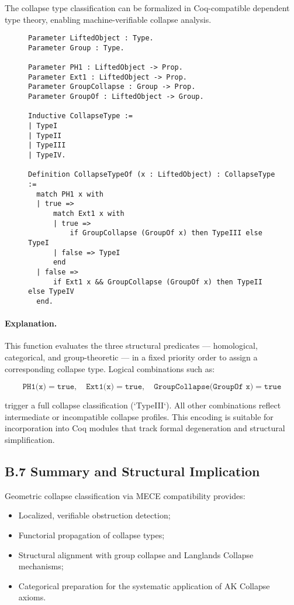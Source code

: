 \documentclass[11pt]{article}
\begin{document}
The collapse type classification can be formalized in Coq-compatible dependent type theory, enabling machine-verifiable collapse analysis.

\begin{figure}[h]
\centering
\begin{lstlisting}[language=Coq, caption=Collapse Type Assignment in Coq]
Parameter LiftedObject : Type.
Parameter Group : Type.

Parameter PH1 : LiftedObject -> Prop.
Parameter Ext1 : LiftedObject -> Prop.
Parameter GroupCollapse : Group -> Prop.
Parameter GroupOf : LiftedObject -> Group.

Inductive CollapseType :=
| TypeI
| TypeII
| TypeIII
| TypeIV.

Definition CollapseTypeOf (x : LiftedObject) : CollapseType :=
  match PH1 x with
  | true =>
      match Ext1 x with
      | true =>
          if GroupCollapse (GroupOf x) then TypeIII else TypeI
      | false => TypeI
      end
  | false =>
      if Ext1 x && GroupCollapse (GroupOf x) then TypeII else TypeIV
  end.
\end{lstlisting}
\end{figure}

\paragraph{Explanation.}
This function evaluates the three structural predicates — homological, categorical, and group-theoretic — in a fixed priority order to assign a corresponding collapse type. Logical combinations such as:

\[
\texttt{PH1(x)} = \texttt{true},\quad \texttt{Ext1(x)} = \texttt{true},\quad \texttt{GroupCollapse(GroupOf x)} = \texttt{true}
\]

trigger a full collapse classification (`TypeIII`). All other combinations reflect intermediate or incompatible collapse profiles. This encoding is suitable for incorporation into Coq modules that track formal degeneration and structural simplification.


\subsection*{B.7 Summary and Structural Implication}

Geometric collapse classification via MECE compatibility provides:

\begin{itemize}
    \item Localized, verifiable obstruction detection;
    \item Functorial propagation of collapse types;
    \item Structural alignment with group collapse and Langlands Collapse mechanisms;
    \item Categorical preparation for the systematic application of AK Collapse axioms.
\end{itemize}
\end{document}

